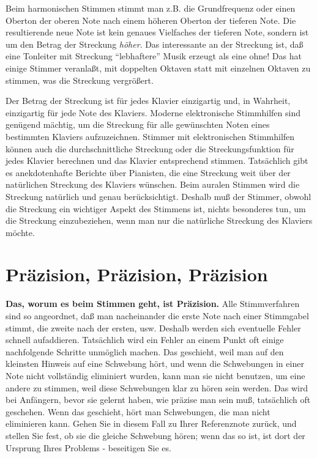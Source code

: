 Beim harmonischen Stimmen stimmt man z.B. die Grundfrequenz oder einen Oberton der oberen Note nach einem höheren Oberton der tieferen Note.
Die resultierende neue Note ist kein genaues Vielfaches der tieferen Note, sondern ist um den Betrag der Streckung \textit{höher}.
Das interessante an der Streckung ist, daß eine Tonleiter mit Streckung \enquote{lebhaftere} Musik erzeugt als eine ohne!
Das hat einige Stimmer veranlaßt, mit doppelten Oktaven statt mit einzelnen Oktaven zu stimmen, was die Streckung vergrößert.

Der Betrag der Streckung ist für jedes Klavier einzigartig und, in Wahrheit, einzigartig für jede Note des Klaviers.
Moderne elektronische Stimmhilfen sind genügend mächtig, um die Streckung für alle gewünschten Noten eines bestimmten Klaviers aufzuzeichnen.
Stimmer mit elektronischen Stimmhilfen können auch die durchschnittliche Streckung oder die Streckungsfunktion für jedes Klavier berechnen und das Klavier entsprechend stimmen.
Tatsächlich gibt es anekdotenhafte Berichte über Pianisten, die eine Streckung weit über der natürlichen Streckung des Klaviers wünschen.
Beim auralen Stimmen wird die Streckung natürlich und genau berücksichtigt.
Deshalb muß der Stimmer, obwohl die Streckung ein wichtiger Aspekt des Stimmens ist, nichts besonderes tun, um die Streckung einzubeziehen, wenn man nur die natürliche Streckung des Klaviers möchte.
 

\hypertarget{c2_5l}{}
\section{Präzision, Präzision, Präzision}
\label{c2_5_prae} 

\textbf{Das, worum es beim Stimmen geht, ist Präzision.}
Alle Stimmverfahren sind so angeordnet, daß man nacheinander die erste Note nach einer Stimmgabel stimmt, die zweite nach der ersten, usw.
Deshalb werden sich eventuelle Fehler schnell aufaddieren.
Tatsächlich wird ein Fehler an einem Punkt oft einige nachfolgende Schritte unmöglich machen.
Das geschieht, weil man auf den kleinsten Hinweis auf eine Schwebung hört, und wenn die Schwebungen in einer Note nicht vollständig eliminiert wurden, kann man sie nicht benutzen, um eine andere zu stimmen, weil diese Schwebungen klar zu hören sein werden.
Das wird bei Anfängern, bevor sie gelernt haben, wie präzise man sein muß, tatsächlich oft geschehen.
Wenn das geschieht, hört man Schwebungen, die man nicht eliminieren kann.
Gehen Sie in diesem Fall zu Ihrer Referenznote zurück, und stellen Sie fest, ob sie die gleiche Schwebung hören; wenn das so ist, ist dort der Ursprung Ihres Problems - beseitigen Sie es.

